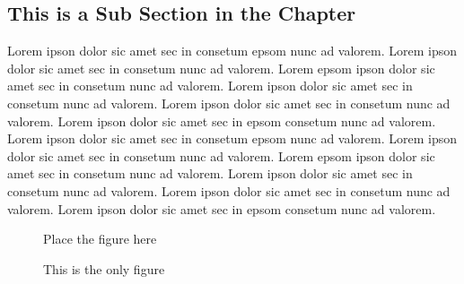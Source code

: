 \subsection{This is a Sub Section in the Chapter}
Lorem ipson dolor sic amet sec in consetum epsom nunc ad valorem. Lorem ipson dolor sic amet
sec in consetum nunc ad valorem. Lorem epsom ipson dolor sic amet sec in consetum nunc ad valorem. 
Lorem ipson dolor sic amet sec in consetum nunc ad valorem. Lorem ipson dolor sic amet
sec in consetum nunc ad valorem. Lorem ipson dolor sic amet sec in epsom consetum nunc ad valorem.
Lorem ipson dolor sic amet sec in consetum epsom nunc ad valorem. Lorem ipson dolor sic amet
sec in consetum nunc ad valorem. Lorem epsom ipson dolor sic amet sec in consetum nunc ad valorem. 
Lorem ipson dolor sic amet sec in consetum nunc ad valorem. Lorem ipson dolor sic amet
sec in consetum nunc ad valorem. Lorem ipson dolor sic amet sec in epsom consetum nunc ad valorem.
\begin{figure}
Place the figure here
\caption{This is the only figure}
\end{figure}

